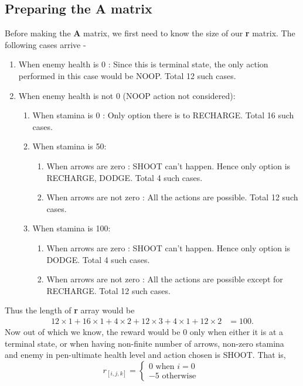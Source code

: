 \documentclass[11pt]{article}
\begin{document}
	\subsection{Preparing the A matrix}
	Before making the \textbf{A} matrix, we first need to know the size of our \textbf{r} matrix.
	The following cases arrive - 
	\begin{enumerate}
		\item When enemy health is 0 : Since this is terminal state, the only action performed in this case would be NOOP.
		Total 12 such cases.
		\item When enemy health is not 0 (NOOP action not considered): 
			\begin{enumerate}
				\item When stamina is 0 : Only option there is to RECHARGE. Total 16 such cases.
				\item When stamina is 50: 
				\begin{enumerate}
					\item When arrows are zero : SHOOT can't happen. Hence only option is RECHARGE, DODGE. Total 4 such cases.
					\item When arrows are not zero : All the actions are possible. Total 12 such cases.
				\end{enumerate}
				\item When stamina is 100: 
				\begin{enumerate}
					\item When arrows are zero : SHOOT can't happen. Hence only option is DODGE. Total 4 such cases.
					\item When arrows are not zero : All the actions are possible except for RECHARGE. Total 12 such cases.
				\end{enumerate} 
			\end{enumerate}
	\end{enumerate}
	Thus the length of \textbf{r} array would be 
	\begin{align*}
		12\times1 + 16\times1 + 4\times2 + 12\times3 + 4\times1 + 12\times2 &= 100. 
	\end{align*}
	Now out of which we know, the reward would be 0 only when either it is at a terminal state, or when having non-finite number of arrows, non-zero stamina and 
	enemy in pen-ultimate health level and action chosen is SHOOT. That is,
\[
r_{[i,j,k]} =
\begin{cases}
	0 \text{ when } i = 0\\ 
	-5 \text{ otherwise }
\end{cases}
\]
\end{document}
